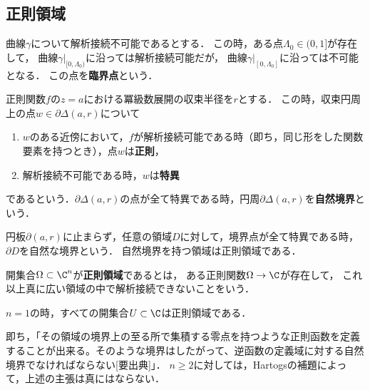 \documentclass[uplatex, dvipdfmx]{jsreport}
\begin{document}
\subsection{正則領域}

\begin{definition}
    曲線$\gamma$について解析接続不可能であるとする．
    この時，ある点$\Lambda_0\in(0,1]$が存在して，
    曲線$\gamma|_{[0,\Lambda_0)}$に沿っては解析接続可能だが，
    曲線$\gamma|_{[0,\Lambda_0]}$に沿っては不可能となる．
    この点を\textbf{臨界点}という．
\end{definition}

\begin{definition}
    正則関数$f$の$z=a$における冪級数展開の収束半径を$r$とする．
    この時，収束円周上の点$w\in\partial\Delta(a,r)$について
    \begin{enumerate}
        \item $w$のある近傍において，$f$が解析接続可能である時（即ち，同じ形をした関数要素を持つとき），点$w$は\textbf{正則}，
        \item 解析接続不可能である時，$w$は\textbf{特異}
    \end{enumerate}
    であるという．$\partial\Delta(a,r)$の点が全て特異である時，円周$\partial\Delta(a,r)$を\textbf{自然境界}という．

    円板$\partial(a,r)$に止まらず，任意の領域$D$に対して，境界点が全て特異である時，$\partial D$を自然な境界という．
    自然境界を持つ領域は正則領域である．
\end{definition}

\begin{definition}
    開集合$\Omega\subset\C^n$が\textbf{正則領域}であるとは，
    ある正則関数$\Omega\to\C$が存在して，
    これ以上真に広い領域の中で解析接続できないことをいう．
\end{definition}

\begin{proposition}
    $n=1$の時，すべての開集合$U\subset\C$は正則領域である．
\end{proposition}
\begin{remark}
    即ち，「その領域の境界上の至る所で集積する零点を持つような正則函数を定義することが出来る。そのような境界はしたがって、逆函数の定義域に対する自然境界でなければならない[要出典]」．
    $n\ge 2$に対しては，Hartogsの補題によって，上述の主張は真にはならない．
\end{remark}
\end{document}
